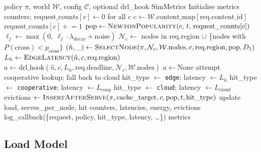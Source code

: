 \documentclass[12pt]{article}
\begin{document}
\begin{algorithm}[h]
\caption{Main Simulation Loop (\texttt{run\_simulation})}
\label{alg:sim}
\begin{algorithmic}[1]
\Require policy $\pi$, world $\mathcal{W}$, config $\mathcal{C}$, optional drl\_hook
\Ensure SimMetrics
\State Initialise metrics counters; $\text{request\_counts}[c] \leftarrow 0$ for all $c$
  \State $c \leftarrow \mathcal{W}.\text{content\_map}[\text{req}.\text{content\_id}]$
  \State $\text{request\_counts}[c] \mathrel{+}= 1$
  \State $\text{pop} \leftarrow \textsc{NewtonPopularity}(c,\, t,\, \text{request\_counts}[c])$
    \State $\ell_j \leftarrow \max(0,\; \ell_j \cdot \lambda_{\text{decay}} + \text{noise})$ 
  \EndFor
  \State $\mathcal{N}_c \leftarrow$ nodes in req.region $\cup$ \{nodes with $P(\text{cross}) < p_{\text{cross}}\}$
  \State $(\hat{n}, \_) \leftarrow \textsc{SelectNode}(\pi, \mathcal{N}_c, \mathcal{W}.\text{nodes}, c, \text{req.region}, \text{pop}, D_1)$
  \State $L_{\hat{n}} \leftarrow \textsc{EdgeLatency}(\hat{n}, c, \text{req.region})$
    \State $a \leftarrow \text{drl\_hook}(\hat{n}, c, L_{\hat{n}}, \text{req.deadline}, \mathcal{N}_c, \mathcal{W}.\text{nodes})$
  \Else
    \State $a \leftarrow \text{None}$
  \EndIf
    \State attempt cooperative lookup; fall back to cloud
    \State hit\_type $\leftarrow$ \texttt{edge}; latency $\leftarrow L_{\hat{n}}$
    \State hit\_type $\leftarrow$ \texttt{cooperative}; latency $\leftarrow L_{\text{coop}}$
  \Else
    \State hit\_type $\leftarrow$ \texttt{cloud}; latency $\leftarrow L_{\text{cloud}}$
  \EndIf
  \State evictions $\leftarrow \textsc{InsertAfterServe}(\pi, \text{cache\_target}, c, \text{pop}, t, \text{hit\_type})$
  \State update load, serves\_per\_node, hit counters, latencies, energy, evictions
    \State log\_callback(\{request, policy, hit\_type, latency, \ldots\})
  \EndIf
\EndFor
\State \Return metrics
\end{algorithmic}
\end{algorithm}

\subsection{Load Model}
\end{document}
